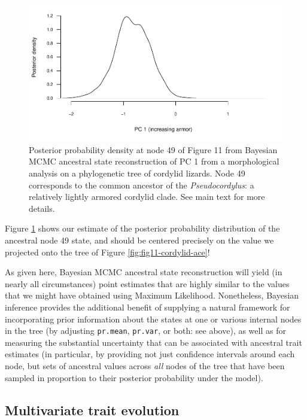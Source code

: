 \documentclass[fleqn,10pt,lineno]{wlpeerj} %
\begin{document}
\begin{figure}
\includegraphics[width=1\linewidth]{Revell.phytools-v2_peerj_files/figure-latex/fig12-cordylid-pd-1} \caption{Posterior probability density at node 49 of Figure 11 from Bayesian MCMC ancestral state reconstruction of PC 1 from a morphological analysis on a phylogenetic tree of cordylid lizards. Node 49 corresponds to the common ancestor of the \textit{Pseudocordylus}: a relatively lightly armored cordylid clade. See main text for more details.}\label{fig:fig12-cordylid-pd}
\end{figure}

Figure \ref{fig:fig12-cordylid-pd} shows our estimate of the posterior probability distribution of the ancestral node 49 state, and should be centered precisely on the value we projected onto the tree of Figure \ref{fig:fig11-cordylid-ace}!

As given here, Bayesian MCMC ancestral state reconstruction will yield (in nearly all circumstances) point estimates that are highly similar to the values that we might have obtained using Maximum Likelihood. Nonetheless, Bayesian inference provides the additional benefit of supplying a natural framework for incorporating prior information about the states at one or various internal nodes in the tree (by adjusting \texttt{pr.mean}, \texttt{pr.var}, or both: see above), as well as for measuring the substantial uncertainty that can be associated with ancestral trait estimates (in particular, by providing not just confidence intervals around each node, but sets of ancestral values across \emph{all} nodes of the tree that have been sampled in proportion to their posterior probability under the model).

\hypertarget{multivariate-trait-evolution}{%
\subsection{Multivariate trait evolution}\label{multivariate-trait-evolution}}
\end{document}
